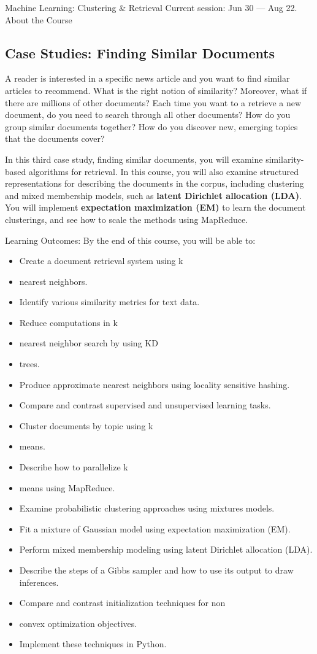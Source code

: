 Machine Learning: Clustering & Retrieval
Current session: Jun 30 — Aug 22.
About the Course
\subsection{Case Studies: Finding Similar Documents}

A reader is interested in a specific news article and you want to find similar articles to recommend.  What is the right notion of similarity?  Moreover, what if there are millions of other documents?  Each time you want to a retrieve a new document, do you need to search through all other documents?  How do you group similar documents together?  How do you discover new, emerging topics that the documents cover?   

In this third case study, finding similar documents, you will examine similarity-based algorithms for retrieval.  In this course, you will also examine structured representations for describing the documents in the corpus, including clustering and mixed membership models, such as \textbf{latent Dirichlet allocation (LDA)}.  You will implement \textbf{expectation maximization (EM)} to learn the document clusterings, and see how to scale the methods using MapReduce.

Learning Outcomes:  By the end of this course, you will be able to:
\begin{itemize}
   \item Create a document retrieval system using k\item nearest neighbors.
   \item Identify various similarity metrics for text data.
   \item Reduce computations in k\item nearest neighbor search by using KD\item trees.
   \item Produce approximate nearest neighbors using locality sensitive hashing.
   \item Compare and contrast supervised and unsupervised learning tasks.
   \item Cluster documents by topic using k\item means.
   \item Describe how to parallelize k\item means using MapReduce.
   \item Examine probabilistic clustering approaches using mixtures models.
   \item Fit a mixture of Gaussian model using expectation maximization (EM).
   \item Perform mixed membership modeling using latent Dirichlet allocation (LDA).
   \item Describe the steps of a Gibbs sampler and how to use its output to draw inferences.
   \item Compare and contrast initialization techniques for non\item convex optimization objectives.
   \item Implement these techniques in Python.
  \end{itemize}
